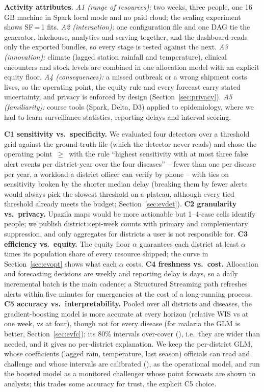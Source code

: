 \documentclass[conference]{IEEEtran}
\begin{document}
\textbf{Activity attributes.} \emph{A1 (range of resources):} two weeks, three people, one 16\,GB machine in
Spark local mode and no paid cloud; the scaling experiment shows SF\,=\,1 fits. \emph{A2 (interaction):} one
configuration file and one DAG tie the generator, lakehouse, analytics and serving together, and the dashboard
reads only the exported bundles, so every stage is tested against the next. \emph{A3 (innovation):} climate
(lagged station rainfall and temperature), clinical encounters and stock levels are combined in one allocation
model with an explicit equity floor. \emph{A4 (consequences):} a missed outbreak or a wrong shipment costs lives,
so the operating point, the equity rule and every forecast carry stated uncertainty, and privacy is enforced by
design (Section~\ref{sec:privacy}). \emph{A5 (familiarity):} course tools (Spark, Delta, D3) applied to
epidemiology, where we had to learn surveillance statistics, reporting delays and interval scoring.

\textbf{C1 sensitivity vs.\ specificity.} We evaluated four detectors over a threshold grid against the
ground-truth file (which the detector never reads) and chose the operating point \OpMethod{}\,$\geq$\,\OpThreshold{}
with the rule ``highest sensitivity with at most three false alert events per district-year over the four
diseases'' -- fewer than one per disease per year, a workload a district officer can verify by phone --
with ties on sensitivity broken by the shorter median delay (breaking them by fewer alerts would always pick
the slowest threshold on a plateau, although every tied threshold already meets the budget;
Section~\ref{sec:evdet}). \textbf{C2 granularity vs.\ privacy.} Upazila maps would be more
actionable but 1--4-case cells identify people; we publish district$\times$epi-week counts with primary and
complementary suppression, and only aggregates for districts a user is not responsible for.
\textbf{C3 efficiency vs.\ equity.} The equity floor $\alpha$ guarantees each district at least $\alpha$ times its
population share of every resource shipped; the curve in Section~\ref{sec:evopt} shows what each $\alpha$ costs.
\textbf{C4 freshness vs.\ cost.} Allocation and forecasting decisions are weekly and reporting delay is days,
so a daily incremental batch is the main cadence; a Structured Streaming path refreshes alerts within five
minutes for emergencies at the cost of a long-running process. \textbf{C5 accuracy vs.\ interpretability.}
Pooled over all districts and diseases, the gradient-boosting model is more accurate at every horizon (relative WIS
\HgbRelWISOne{} vs \GlmRelWISOne{} at one week, \HgbRelWISFour{} vs \GlmRelWISFour{} at four), though not for every
disease (for malaria the GLM is better, Section~\ref{sec:evfc}); its 80\% intervals over-cover
(\HgbCovOne{}), i.e.\ they are wider than needed, and it gives no per-district explanation. We keep the per-district
GLM, whose coefficients (lagged rain, temperature, last season) officials can read and challenge and whose intervals
are calibrated (\GlmCovOne{}), as the operational model, and run the boosted model as a monitored challenger whose
point forecasts are shown to analysts; this trades some accuracy for trust, the explicit C5 choice.
\end{document}
